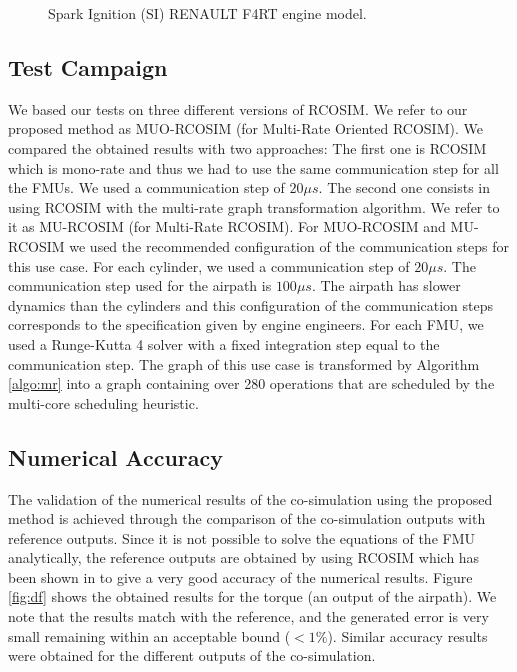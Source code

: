 \begin{figure}[phbt]
\centering

\caption{Spark Ignition (SI) RENAULT F4RT engine model.}
\label{fig:use_case}
\end{figure}

\subsection{Test Campaign}

We based our tests on three different versions of RCOSIM. We refer to our proposed method as MUO-RCOSIM (for Multi-Rate Oriented RCOSIM). We compared the obtained results with two approaches: The first one is RCOSIM which is mono-rate and thus we had to use the same communication step for all the FMUs. We used a communication step of $20 {\mu}s$. The second one consists in using RCOSIM with the multi-rate graph transformation algorithm. We refer to it as MU-RCOSIM (for Multi-Rate RCOSIM). For MUO-RCOSIM and MU-RCOSIM we used the recommended configuration of the communication steps for this use case. For each cylinder, we used a communication step of $20 {\mu}s$. The communication step used for the airpath is $100 {\mu}s$. The airpath has slower dynamics than the cylinders and this configuration of the communication steps corresponds to the specification given by engine engineers. For each FMU, we used a Runge-Kutta 4 solver with a fixed integration step equal to the communication step. The graph of this use case is transformed by Algorithm \ref{algo:mr} into a graph containing over 280 operations that are scheduled by the multi-core scheduling heuristic.      

\subsection{Numerical Accuracy}

The validation of the numerical results of the co-simulation using the proposed method is achieved through the comparison of the co-simulation outputs with reference outputs. Since it is not possible to solve the equations of the FMU analytically, the reference outputs are obtained by using RCOSIM which has been shown in \cite{benkhaled:2014} to give a very good accuracy of the numerical results. Figure \ref{fig:df} shows the obtained results for the torque (an output of the airpath). We note that the results match with the reference, and the generated error is very small remaining within an acceptable bound ($< 1\%$). Similar accuracy results were obtained for the different outputs of the co-simulation.

